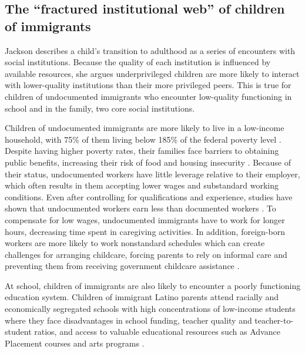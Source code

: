 \documentclass[hidelinks,twoside]{article}
\begin{document}
\subsection*{The ``fractured institutional web” of children of immigrants}

Jackson \citeyearpar{jackson_2020_manifesto} describes a child’s transition to adulthood as a series of encounters with social institutions. Because the quality of each institution is influenced by available resources, she argues underprivileged children are more likely to interact with lower-quality institutions than their more privileged peers. This is true for children of undocumented immigrants who encounter low-quality functioning in school and in the family, two core social institutions.  

Children of undocumented immigrants are more likely to live in a low-income household, with 75\% of them living below 185\% of the federal poverty level \citep{capps_2016_a}.  Despite having higher poverty rates, their families face barriers to obtaining public benefits, increasing their risk of food and housing insecurity \citep{acevedogarcia_2021_including}. Because of their status, undocumented workers have little leverage relative to their employer, which often results in them accepting lower wages and substandard working conditions. Even after controlling for qualifications and experience, studies have shown that undocumented workers earn less than documented workers \citep{donato_2008_the,flippen_2012_laboring,hall_2010_legal}. To compensate for low wages, undocumented immigrants have to work for longer hours, decreasing time spent in caregiving activities. In addition, foreign-born workers are more likely to work nonstandard schedules \citep{dramski_2017_on} which can create challenges for arranging childcare, forcing parents to rely on informal care and preventing them from receiving government childcare assistance \citep{enchautegui_2015_who,kim_2021_mothers}.

At school, children of immigrants are also likely to encounter a poorly functioning education system. Children of immigrant Latino parents attend racially and economically segregated schools with high concentrations of low-income students \citep{fuller_2019_worsening} where they face disadvantages in school funding, teacher quality and teacher-to-student ratios, and access to valuable educational resources such as Advance Placement courses and arts programs \citep{usdepartmentofeducation_2014_20132014,ckirabojackson_2015_the}.
\end{document}
